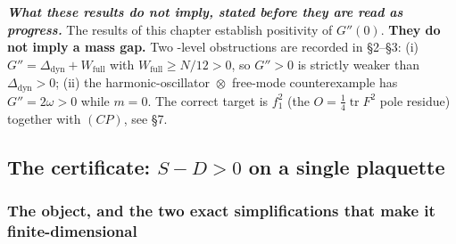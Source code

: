 \medskip
\noindent\textbf{\LN{} \emph{What these results do not imply, stated before they are read as progress.}}
The results of this chapter establish positivity of $G''(0)$. \textbf{They do not imply a mass gap.} Two
\LT{}-level obstructions are recorded in  \S2--\S3: (i)
$G''=\Delta_{\mathrm{dyn}}+W_{\mathrm{full}}$ with $W_{\mathrm{full}}\ge N/12>0$, so $G''>0$ is strictly
weaker than $\Delta_{\mathrm{dyn}}>0$; (ii) the harmonic-oscillator~$\otimes$~free-mode counterexample has
$G''=2\omega>0$ while $m=0$. The correct target is $f_{1}^{2}$ (the $O=\tfrac14\operatorname{tr}F^{2}$
pole residue) together with $(CP)$, see  \S7.


\subsection{The certificate: $S-D>0$ on a single plaquette}
\label{sec:h1s-cert}

\subsubsection*{The object, and the two exact simplifications that make it finite-dimensional}

